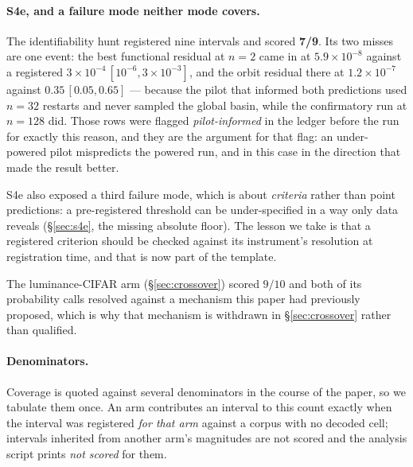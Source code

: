 \documentclass[10pt,twocolumn,letterpaper]{article}
\theoremstyle{definition}
\begin{document}
\paragraph{S4e, and a failure mode neither mode covers.} The identifiability hunt registered nine
intervals and scored \textbf{7/9}. Its two misses are one event: the best functional residual at
$n=2$ came in at $5.9\times10^{-8}$ against a registered $3\times10^{-4}\,[10^{-6}, 3\times10^{-3}]$,
and the orbit residual there at $1.2\times10^{-7}$ against $0.35\,[0.05, 0.65]$ --- because the
pilot that informed both predictions used $n=32$ restarts and never sampled the global basin, while
the confirmatory run at $n=128$ did. Those rows were flagged \emph{pilot-informed} in the ledger
before the run for exactly this reason, and they are the argument for that flag: an under-powered
pilot mispredicts the powered run, and in this case in the direction that made the result better.

S4e also exposed a third failure mode, which is about \emph{criteria} rather than point
predictions: a pre-registered threshold can be under-specified in a way only data reveals
(\S\ref{sec:s4e}, the missing absolute floor). The lesson we take is that a registered criterion
should be checked against its instrument's resolution at registration time, and that is now part of
the template.

The luminance-CIFAR arm (\S\ref{sec:crossover}) scored $9/10$ and both of its probability calls
resolved against a mechanism this paper had previously proposed, which is why that mechanism is
withdrawn in \S\ref{sec:crossover} rather than qualified.

\paragraph{Denominators.} Coverage is quoted against several denominators in the course of the
paper, so we tabulate them once. An arm contributes an interval to this count exactly when the
interval was registered \emph{for that arm} against a corpus with no decoded cell; intervals
inherited from another arm's magnitudes are not scored and the analysis script prints
\emph{not scored} for them.
\end{document}
